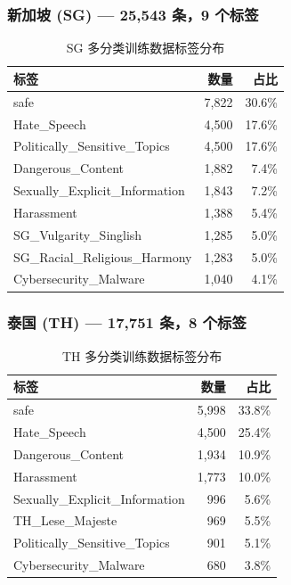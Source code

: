 \documentclass[11pt,a4paper]{article}
\begin{document}
\subsubsection{新加坡 (SG) — 25,543 条，9 个标签}
\begin{table}[h]\centering
\caption{SG 多分类训练数据标签分布}
\begin{tabular}{@{}lrr@{}}
\toprule
\textbf{标签} & \textbf{数量} & \textbf{占比} \\
\midrule
safe & 7,822 & 30.6\% \\
Hate_Speech & 4,500 & 17.6\% \\
Politically_Sensitive_Topics & 4,500 & 17.6\% \\
Dangerous_Content & 1,882 & 7.4\% \\
Sexually_Explicit_Information & 1,843 & 7.2\% \\
Harassment & 1,388 & 5.4\% \\
SG_Vulgarity_Singlish & 1,285 & 5.0\% \\
SG_Racial_Religious_Harmony & 1,283 & 5.0\% \\
Cybersecurity_Malware & 1,040 & 4.1\% \\
\bottomrule
\end{tabular}
\end{table}

\subsubsection{泰国 (TH) — 17,751 条，8 个标签}
\begin{table}[h]\centering
\caption{TH 多分类训练数据标签分布}
\begin{tabular}{@{}lrr@{}}
\toprule
\textbf{标签} & \textbf{数量} & \textbf{占比} \\
\midrule
safe & 5,998 & 33.8\% \\
Hate_Speech & 4,500 & 25.4\% \\
Dangerous_Content & 1,934 & 10.9\% \\
Harassment & 1,773 & 10.0\% \\
Sexually_Explicit_Information & 996 & 5.6\% \\
TH_Lese_Majeste & 969 & 5.5\% \\
Politically_Sensitive_Topics & 901 & 5.1\% \\
Cybersecurity_Malware & 680 & 3.8\% \\
\bottomrule
\end{tabular}
\end{table}
\end{document}
